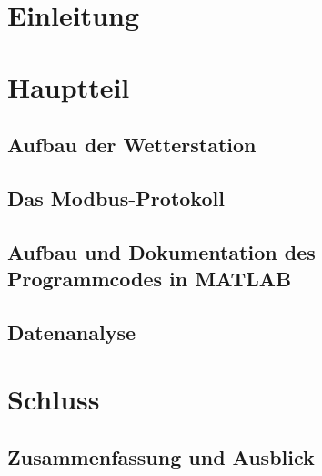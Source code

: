 \documentclass[11pt,a4paper,oneside,ngerman,appendixprefix=true,listof=chapterentry]{report}
\begin{document}




\tableofcontents
\listoffigures
\listoftables
\part{Einleitung}

\part{Hauptteil}
\chapter{Aufbau der Wetterstation}

\chapter{Das Modbus-Protokoll}

\chapter{Aufbau und Dokumentation des Programmcodes in MATLAB}

\chapter{Datenanalyse}

\part{Schluss}
\chapter{Zusammenfassung und Ausblick}


 
 
\end{document}
